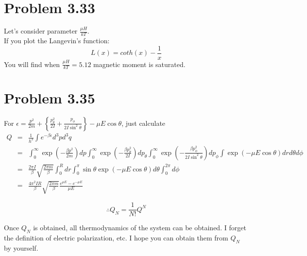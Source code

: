 \documentclass{article}
\begin{document}
\section*{Problem 3.33} %
\label{sec:problem_3_33}
	Let's consider parameter $\frac{\mu H}{kT}$.\\
	If you plot the Langevin's function:
	$$L(x)=coth(x)-\frac{1}{x}$$ 
	You will find when $\frac{\mu H}{kT}=5.12$ magnetic moment is saturated.\\



\section*{Problem 3.35} %
\label{sec:problem_3_35}
	For $ \epsilon=\frac{p^2}{2m}+\left\{ \frac{p_{\theta}^2}{2I}+\frac{p_{\phi}}{2I\sin^2 \theta} \right\} - \mu E \cos \theta $, just calculate
	\begin{eqnarray*}
		Q &=&  \frac{1}{h^3} \int e^{-\beta \epsilon} d^3pd^3q\\
		&=&\int^{\infty}_0 \exp\left(- \frac{\beta p^2}{2m} \right)dp\int^{\infty}_0 \exp\left(- \frac{\beta p_{\theta}^2}{2I} \right)dp_{\theta}\int^{\infty}_0 \exp\left(- \frac{\beta p_{\phi}^2}{2I\sin^2 \theta} \right)dp_{\phi}\int\exp(- \mu E \cos \theta) drd \theta d \phi\\
		&=&\frac{2 \pi I}{\beta} \sqrt{ \frac{2 \pi m}{\beta} } \int^R_0 dr \int^{\pi}_0 \sin \theta \exp(-\mu E \cos\theta)d \theta \int^{2 \pi}_0 d \phi\\
		&=&\frac{4 \pi^2 IR}{\beta} \sqrt{ \frac{2 \pi m}{\beta} }\frac{e^{\mu E}-e^{-\mu E}}{\mu E}
	\end{eqnarray*}

	\begin{equation*}
		\therefore Q_N = \frac{1}{N!} Q^N
	\end{equation*}

	Once $Q_N$ is obtained, all thermodynamics of the system can be obtained. I forget the definition of electric polarization, etc. I hope you can obtain them from $Q_N$ by yourself.
\end{document}

